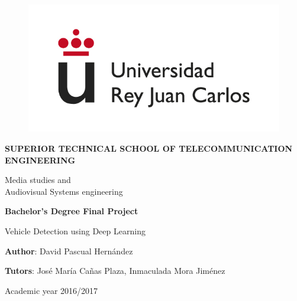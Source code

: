 \begin{titlepage}

\begin{center}

\begin{figure}[htb]
\begin{center}
	\includegraphics[width=0.6\linewidth]{figures/logo.jpg}
\end{center}
\end{figure}

\vspace{10mm}

\begin{Large}
\textbf{SUPERIOR TECHNICAL SCHOOL OF TELECOMMUNICATION ENGINEERING}
\vspace{10mm}
\end{Large}

\begin{Large}
Media studies and\\ \vspace{2mm} Audiovisual Systems engineering
\end{Large}

\vspace{10mm}

\begin{large}
\textbf{Bachelor's Degree Final Project}
\end{large}
\vspace{25mm}

\begin{huge}
	Vehicle Detection using Deep Learning
\end{huge}

\vspace{25mm}

\begin{large}
\textbf{Author}: David Pascual Hernández

\textbf{Tutors}: José María Cañas Plaza, Inmaculada Mora Jiménez 

\vspace{10mm}

Academic year 2016/2017
\end{large}

\vspace{10mm}

\end{center}

\end{titlepage}

